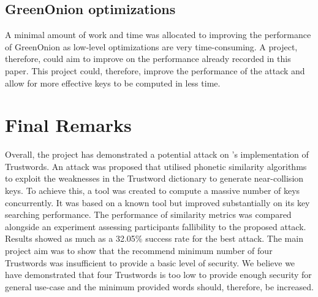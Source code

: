 \subsection*{GreenOnion optimizations}
A minimal amount of work and time was allocated to improving the performance of GreenOnion as low-level optimizations are very time-consuming. A project, therefore, could aim to improve on the performance already recorded in this paper. This project could, therefore, improve the performance of the attack and allow for more effective keys to be computed in less time. 

\section{Final Remarks}
Overall, the project has demonstrated a potential attack on \pep's implementation of Trustwords. An attack was proposed that utilised phonetic similarity algorithms to exploit the weaknesses in the Trustword dictionary to generate near-collision keys. To achieve this, a tool was created to compute a massive number of keys concurrently. It was based on a known tool but improved substantially on its key searching performance. The performance of similarity metrics was compared alongside an experiment assessing participants fallibility to the proposed attack. Results showed as much as a 32.05\% success rate for the best attack. The main project aim was to show that the recommend minimum number of four Trustwords was insufficient to provide a basic level of security. We believe we have demonstrated that four Trustwords is too low to provide enough security for general use-case and the minimum provided words should, therefore, be increased.